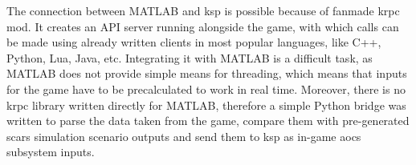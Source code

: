         The connection between MATLAB and \ac{ksp} is possible because of fanmade \ac{krpc} mod. It creates an API server running alongside the game, with which calls can be made using already written clients in most popular languages, like C++, Python, Lua, Java, etc. Integrating it with MATLAB is a difficult task, as MATLAB does not provide simple means for threading, which means that inputs for the game have to be precalculated to work in real time. Moreover, there is no \ac{krpc} library written directly for MATLAB, therefore a simple Python bridge was written to parse the data taken from the game, compare them with pre-generated \ac{scars} simulation scenario outputs and send them to \ac{ksp} as in-game \ac{aocs} subsystem inputs.


